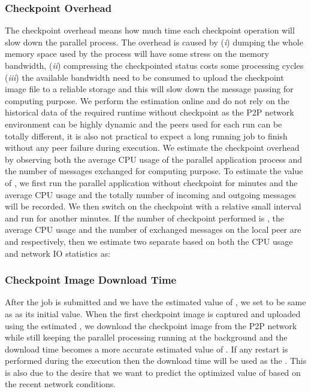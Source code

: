 \documentclass[times, 12pt, onecolumn]{article}
\begin{document}
\subsubsection{Checkpoint Overhead }

The checkpoint overhead means how much time each checkpoint operation
will slow down the parallel process. The overhead is caused by (\emph{i}) dumping
the whole memory space used by the process will have some stress on the memory bandwidth, (\emph{ii}) 
compressing the checkpointed status costs some processing cycles (\emph{iii}) the available bandwidth 
need to be consumed to upload the checkpoint image file to a reliable storage and this will slow down 
the message passing for computing purpose. We perform the estimation online and do not rely on the historical 
data of the required runtime without checkpoint as the P2P network environment can be highly dynamic and 
the peers used for each run can be totally different, it is also not practical to expect a long running job 
to finish without any peer failure during execution. We estimate 
the checkpoint overhead  by observing both the average CPU usage of the parallel application process and 
the number of messages exchanged for computing purpose. To estimate the value of , we first run the 
parallel application without checkpoint for  minutes and the average CPU usage  and the totally
number of incoming and outgoing messages  will be recorded. We then switch on the checkpoint with a 
relative small interval and run for another  minutes. If the number of checkpoint performed is , 
the average CPU usage and the number of exchanged messages on the local peer are  and  respectively,
then we estimate two separate  based on both the CPU usage and network IO statistics as:


\subsubsection{Checkpoint Image Download Time }

After the job is submitted and we have the estimated value
of , we set  to be same as  as its initial value. When the first checkpoint image is captured
and uploaded using the estimated , we download the checkpoint image from the P2P network while
still keeping the parallel processing running at the background and the download time becomes a more 
accurate estimated value of . If any restart is performed during the execution then the download
time will be used as the . This is also due to the desire that we want to predict the optimized value
of  based on the recent network conditions. 
\end{document}
